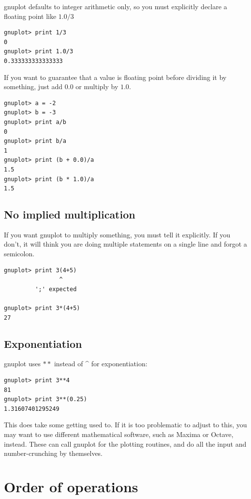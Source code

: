 \documentclass[11pt,letterpaper]{report}
\begin{document}
gnuplot defaults to integer arithmetic only, so you must explicitly declare a floating point like $1.0/3$
\begin{lstlisting}
gnuplot> print 1/3
0
gnuplot> print 1.0/3
0.333333333333333
\end{lstlisting}

If you want to guarantee that a value is floating point before dividing it by something, just add $0.0$ or multiply by $1.0$.

\begin{lstlisting}
gnuplot> a = -2
gnuplot> b = -3
gnuplot> print a/b
0
gnuplot> print b/a
1
gnuplot> print (b + 0.0)/a
1.5
gnuplot> print (b * 1.0)/a
1.5
\end{lstlisting}

\subsection{No implied multiplication}

If you want gnuplot to multiply something, you must tell it explicitly. If you don't, it will think you are doing multiple statements on a single line and forgot a semicolon.

\begin{verbatim}
gnuplot> print 3(4+5)
                ^
         ';' expected
         
gnuplot> print 3*(4+5)
27
\end{verbatim}

\subsection{Exponentiation}

gnuplot uses
$**$
instead of 
\^{}
for exponentiation:
\begin{lstlisting}
gnuplot> print 3**4
81
gnuplot> print 3**(0.25)
1.31607401295249
\end{lstlisting}

This does take some getting used to. If it is too problematic to adjust to this, you may want to use different mathematical software, such as Maxima or Octave, instead. These can call gnuplot for the plotting routines, and do all the input and number-crunching by themselves.

\section{Order of operations}

\end{document}
